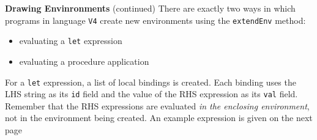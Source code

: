 \begin{minipage}[t]{\sw}
\slidenumber
\LARGE
{\bf Drawing Envinronments} (continued)\exx
There are exactly two ways in which programs
in language \verb'V4' create new environments
using the \verb'extendEnv' method:
\begin{itemize}
\itemsep 0in
\item evaluating a \verb'let' expression
\item evaluating a procedure application
\end{itemize}
For a \verb'let' expression,
a list of local bindings is created.
Each binding uses the LHS string as its \verb'id' field
and the value of the RHS expression as its \verb'val' field.
Remember that the RHS expressions are evaluated
{\em in the enclosing environment},
not in the environment being created.
An example expression is given on the next page
\end{minipage}

